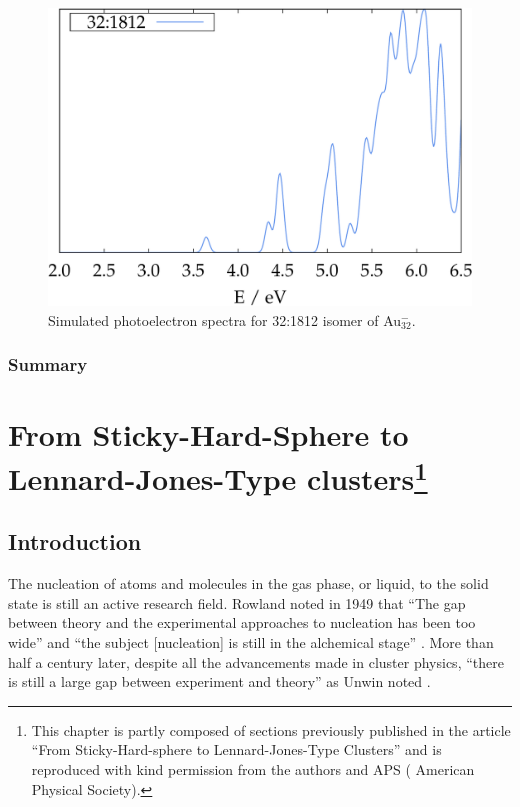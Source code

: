 \begin{figure}[htbp]
\begin{center}
\includegraphics[width=.8\textwidth]{golddual/photo/Au32/nonrel/compare.pdf}
\caption{Simulated photoelectron spectra for 32:1812 isomer of Au$_{32}^-$.}
  \label{fig:photo_Au32}
\end{center}
\end{figure}


\subsection{Summary}

\chapter[From Sticky-Hard-Sphere to Lennard-Jones-Type clusters]{
    From Sticky-Hard-Sphere to Lennard-Jones-Type clusters\footnote{This
    chapter is partly composed of sections previously published in the article
    ``From Sticky-Hard-sphere to Lennard-Jones-Type Clusters''\autocite{} and
    is reproduced with kind permission from the authors and APS ( American Physical Society).}
}
\label{sec:fromstickyhardspheretoLJtypeclusters}


\section{Introduction}


The nucleation of atoms and molecules in the gas phase, or liquid, to the solid
state is still an active research
field\autocite{Stillinger_Packingstructurestransitions_1984,
Martin-1996,Wales-1996, Vlieg_atomicscaleunderstandingcrystal_2007, Arkus-2010,
Woodley-2010, Karthika-2016, Holmes-Cerfon_StickySphereClusters_2017}.  Rowland
noted in 1949 that ``The gap between theory and the experimental approaches to
nucleation has been too wide'' and ``the subject [nucleation] is still in the
alchemical stage'' \autocite{Rowland-1949}. More than half a century later,
despite all the advancements made in cluster physics, ``there is still a large
gap between experiment and theory'' as Unwin noted \autocite{Unwin-2007}.


